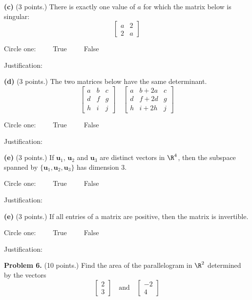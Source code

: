 \documentclass[12pt]{article}
\begin{document}
\vskip1.5in


\textbf{(c)} (3 points.) There is exactly one value of $a$ for which the matrix below is singular:
\[
\begin{bmatrix}a&2\\2&a\end{bmatrix}
\]

Circle one:\ \ \ \ \  True\ \ \ \ \ False

Justification:

\clearpage

\textbf{(d)} (3 points.) The two matrices below have the same determinant.
\[
\begin{bmatrix}a&b&c\\d&f&g\\h&i&j\end{bmatrix}\quad
\begin{bmatrix}a&b+2a&c\\d&f+2d&g\\h&i+2h&j\end{bmatrix}
\]

Circle one:\ \ \ \ \  True\ \ \ \ \ False

Justification:

\vskip1.5in


\textbf{(e)} (3 points.) If $\mathbf{u}_1$, $\mathbf{u}_2$ and $\mathbf{u}_3$ are distinct vectors in $\R^4$, then the subspace spanned by $\{\mathbf{u}_1,\mathbf{u}_2,\mathbf{u}_3\}$ has dimension 3.

Circle one:\ \ \ \ \  True\ \ \ \ \ False

Justification:

\vskip1.5in

\textbf{(e)} (3 points.) If all entries of a matrix are positive, then the matrix is invertible.

Circle one:\ \ \ \ \  True\ \ \ \ \ False

Justification:

\clearpage

\textbf{Problem 6.} (10 points.) Find the area of the parallelogram in $\R^2$ determined by the vectors
\[
\begin{bmatrix}2\\3\end{bmatrix}\quad\text{and}\quad\begin{bmatrix}-2\\4\end{bmatrix}
\]
\end{document}
